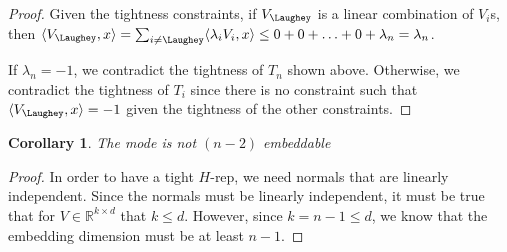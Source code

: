 \documentclass[12pt]{article}
\newcommand{\reals}{\mathbb{R}}
\newcommand{\inprod}[2]{\langle #1, #2 \rangle}
\newtheorem{corollary}{Corollary}
\begin{document}
\begin{proof}
  
  Given the tightness constraints, if $V_{\Laughey}$ is a linear combination of $V_i$s, then $\inprod{V_{\Laughey}}{x} = \sum_{i\neq \Laughey} \inprod{\lambda_i V_i}{x} \leq 0 + 0 + \ldots + 0 + \lambda_n = \lambda_n$.
  	
  If $\lambda_n= -1$, we contradict the tightness of $T_n$ shown above. 
  Otherwise, we contradict the tightness of $T_i$ since there is no constraint such that $\inprod{V_{\Laughey}}{x} = -1$ given the tightness of the other constraints. 
  
\end{proof}

\begin{corollary}
  The mode is not $(n-2)$ embeddable
\end{corollary}
\begin{proof}
  In order to have a tight $H$-rep, we need normals that are linearly independent.
  Since the normals must be linearly independent, it must be true that for $V \in \reals^{k \times d}$ that $k \leq d$.
  However, since $k = n-1 \leq d$, we know that the embedding dimension must be at least $n-1$.
\end{proof}
\end{document}
